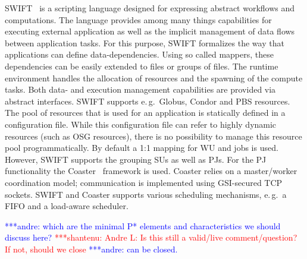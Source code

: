 \documentclass[conference,final]{IEEEtran}
\newcommand{\jhanote}[1]{ {\textcolor{red} { ***shantenu: #1 }}}
\newcommand{\alnote}[1]{ {\textcolor{blue} { ***andre: #1 }}}
\newcommand{\alnote}[1]{}
\newcommand{\jhanote}[1]{}
\begin{document}
SWIFT~\cite{Wilde2011} is a scripting language designed for expressing abstract
workflows and computations. The language provides among many things capabilities
for executing external application as well as the implicit management of data
flows between application tasks. For this purpose, SWIFT formalizes the way that
applications can define data-dependencies. Using so called mappers, these
dependencies can be easily extended to files or groups of files. The runtime
environment handles the allocation of resources and the spawning of the compute
tasks. Both data- and execution management capabilities are provided via
abstract interfaces. SWIFT supports e.\,g.\ Globus, Condor and PBS resources.
The pool of resources that is used for an application is statically defined in a
configuration file. While this configuration file can refer to highly dynamic
resources (such as OSG resources), there is no possibility to manage this
resource pool programmatically. By default a 1:1 mapping for WU and jobs is
used. However, SWIFT supports the grouping SUs as well as PJs. For the PJ
functionality the Coaster~\cite{coasters} framework is used. Coaster relies on a
master/worker coordination model; communication is implemented using GSI-secured
TCP sockets. SWIFT and Coaster supports various scheduling mechanisms, e.\,g.\ 
a FIFO and a load-aware scheduler.








\alnote{which are the minimal P* elements and characteristics we
  should discuss here?}  \jhanote{Andre L: Is this still a valid/live
  comment/question? If not, should we close}\alnote{can be closed.}
\end{document}
